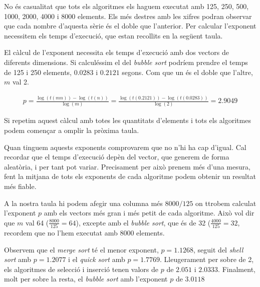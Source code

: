No és casualitat que tots els algoritmes els haguem executat amb 125, 250, 500, 1000, 2000, 4000 i 8000 elements.
Els més destres amb les xifres podran observar que cada nombre d'aquesta sèrie és el doble que l'anterior.
Per calcular l'exponent necessitem els temps d'execució, que estan recollits en la següent taula.

\vspace*{1em}
\noindent
\makebox[\textwidth][c]{
	
}
\vspace*{1em}

El càlcul de l'exponent necessita els temps d'execució amb dos vectors de diferents dimensions. Si calculéssim el del \textit{bubble sort} podríem prendre el temps de 125 i 250 elements, $0.0283$ i $0.2121$ segons.
Com que un és el doble que l'altre, $m$ val 2.

\begin{gather*}	
	p = \frac{\log(t(mn))-\log(t(n))}{\log(m)} = \frac{\log(t(0.2121))-\log(t(0.0283))}{\log(2)} = 2.9049
\end{gather*}

Si repetim aquest càlcul amb totes les quantitats d'elements i tots els algoritmes podem començar a omplir la pròxima taula.

Quan tinguem aquests exponents comprovarem que no n'hi ha cap d'igual. Cal recordar que el temps d'execució depèn del vector, que generem de forma aleatòria, i per tant pot variar.
Precisament per això prenem més d'una mesura, fent la mitjana de tots els exponents de cada algoritme podem obtenir un resultat més fiable.

A la nostra taula hi podem afegir una columna més $8000/125$ on ttrobem calculat l'exponent $p$ amb els vectors més gran i més petit de cada algoritme.
Això vol dir que $m$ val 64 ($\frac{8000}{125} = 64$), excepte amb el \textit{bubble sort}, que és de 32 ($\frac{4000}{125} = 32$, recordem que no l'hem executat amb 8000 elements.

\vspace*{1em}
\noindent
\begin{center}
	
\end{center}
\vspace*{1em}

Observem que el \textit{merge sort} té el menor exponent, $p=1.1268$, seguit del \textit{shell sort} amb $p=1.2077$ i el \textit{quick sort} amb $p=1.7769$.
Lleugerament per sobre de 2, els algoritmes de selecció i inserció tenen valors de $p$ de $2.051$ i $2.0333$.
Finalment, molt per sobre la resta, el \textit{bubble sort} amb l'exponent $p$ de $3.0118$

\begin{center}
	\resizebox{\textwidth}{!}{}
\end{center}